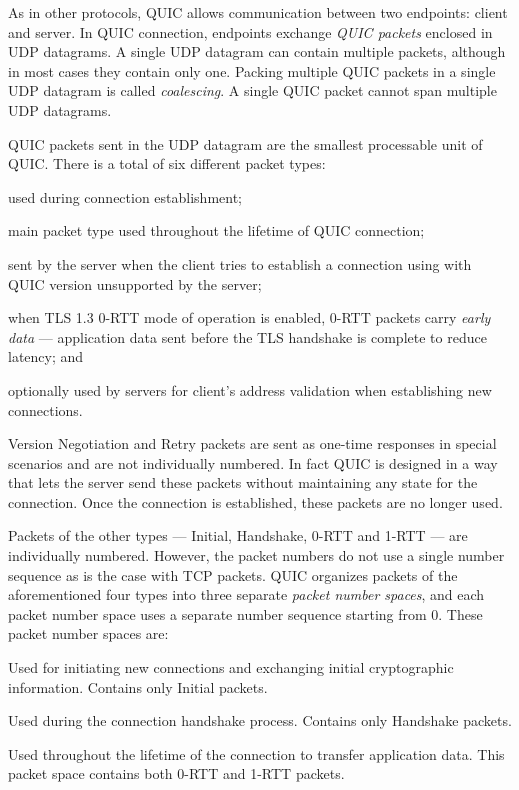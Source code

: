 As in other protocols, QUIC allows communication between two endpoints: client and server. In QUIC
connection, endpoints exchange \textit{QUIC packets} enclosed in UDP datagrams. A single UDP
datagram can contain multiple packets, although in most cases they contain only one. Packing
multiple QUIC packets in a single UDP datagram is called \textit{coalescing}. A single QUIC packet
cannot span multiple UDP datagrams.

QUIC packets sent in the UDP datagram are the smallest processable unit of QUIC\@. There is a total
of six different packet types:

\begin{enumerate}

   used during connection establishment;

   main packet type used throughout the lifetime of QUIC connection;

   sent by the server when the client tries to establish a connection
  using with QUIC version unsupported by the server;

   when TLS 1.3 0-RTT mode of operation is enabled, 0-RTT packets carry \textit{early
  data} --- application data sent before the TLS handshake is complete to reduce latency; and

   optionally used by servers for client's address validation when establishing new
  connections.

\end{enumerate}

Version Negotiation and Retry packets are sent as one-time responses in special scenarios and are
not individually numbered. In fact QUIC is designed in a way that lets the server send these packets
without maintaining any state for the connection. Once the connection is established, these packets
are no longer used.

Packets of the other types --- Initial, Handshake, 0-RTT and 1-RTT --- are individually numbered.
However, the packet numbers do not use a single number sequence as is the case with TCP packets.
QUIC organizes packets of the aforementioned four types into three separate \textit{packet number
  spaces}, and each packet number space uses a separate number sequence starting from 0. These
packet number spaces are:

\begin{enumerate}

   Used for initiating new connections and exchanging initial cryptographic
  information. Contains only Initial packets.

   Used during the connection handshake process. Contains only Handshake packets.

   Used throughout the lifetime of the connection to transfer application data.
  This packet space contains both 0-RTT and 1-RTT packets.

\end{enumerate}

